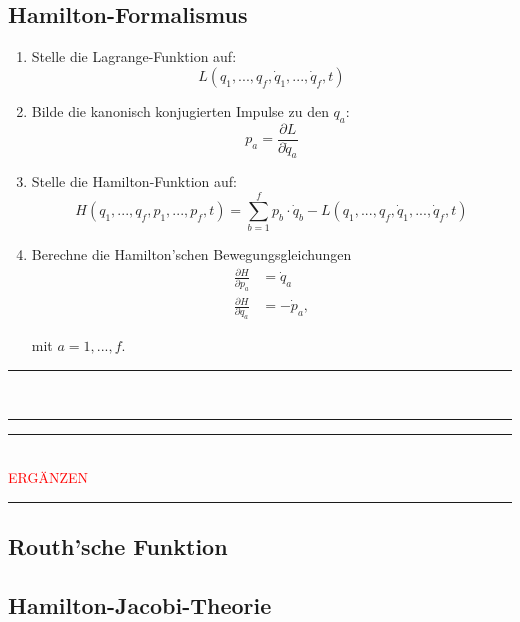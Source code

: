 \documentclass{article}
\begin{document}
\newpage


\subsection{Hamilton-Formalismus}
	\begin{enumerate}
		\item Stelle die Lagrange-Funktion auf:
			$$L(q_1, ..., q_f, \dot{q}_1, ..., \dot{q}_f, t)$$
		
		\item Bilde die kanonisch konjugierten Impulse zu den $q_a$:
			$$p_a = \frac{\partial L}{\partial \dot{q}_a}$$

		\item Stelle die Hamilton-Funktion auf:
			\begin{equation}
				H(q_1, ..., q_f, p_1, ..., p_f, t) = \sum_{b = 1}^f p_b \cdot \dot{q}_b - L(q_1, ..., q_f, \dot{q}_1, ..., \dot{q}_f, t)
			\end{equation}
		
		\item Berechne die Hamilton'schen Bewegungsgleichungen
			\begin{align}
				\frac{\partial H}{\partial p_a} &= \dot{q}_a \\
				\frac{\partial H}{\partial q_a} &= -\dot{p}_a,
			\end{align}
		
		mit $a = 1, ..., f$.
	\end{enumerate}

\vspace{0.5cm}

{\color{blue}
\hrule
	\\





\hrule
}


\newpage


{\color{violet}
\hrule
	\\
	\textcolor{red}{ERGÄNZEN}

\hrule
}


\newpage


\subsection{Routh'sche Funktion}


\newpage


\subsection{Hamilton-Jacobi-Theorie}
\end{document}
